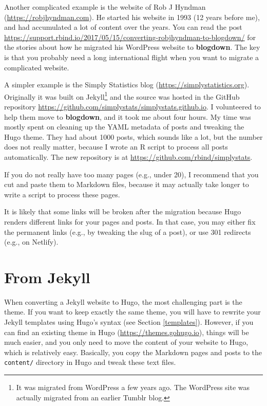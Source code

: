 \documentclass[12pt,]{krantz}
\theoremstyle{definition}
\theoremstyle{definition}
\theoremstyle{definition}
\theoremstyle{remark}
\begin{document}
Another complicated example is the website of Rob J Hyndman
(\url{https://robjhyndman.com}). He started his website in 1993 (12
years before me), and had accumulated a lot of content over the years.
You can read the post
\url{https://support.rbind.io/2017/05/15/converting-robjhyndman-to-blogdown/}
for the stories about how he migrated his WordPress website to
\textbf{blogdown}. The key is that you probably need a long
international flight when you want to migrate a complicated website.

A simpler example is the Simply Statistics blog
(\url{https://simplystatistics.org}). Originally it was built on
Jekyll\footnote{It was migrated from WordPress a few years ago. The
  WordPress site was actually migrated from an earlier Tumblr blog.} and
the source was hosted in the GitHub repository
\url{https://github.com/simplystats/simplystats.github.io}. I
volunteered to help them move to \textbf{blogdown}, and it took me about
four hours. My time was mostly spent on cleaning up the YAML metadata of
posts and tweaking the Hugo theme. They had about 1000 posts, which
sounds like a lot, but the number does not really matter, because I
wrote an R script to process all posts automatically. The new repository
is at \url{https://github.com/rbind/simplystats}.

If you do not really have too many pages (e.g., under 20), I recommend
that you cut and paste them to Markdown files, because it may actually
take longer to write a script to process these pages.

It is likely that some links will be broken after the migration because
Hugo renders different links for your pages and posts. In that case, you
may either fix the permanent links (e.g., by tweaking the slug of a
post), or use 301 redirects (e.g., on Netlify).

\section{From Jekyll}\label{from-jekyll}

When converting a Jekyll website to Hugo, the most
challenging part is the theme. If you want to keep exactly the same
theme, you will have to rewrite your Jekyll templates using Hugo's
syntax (see Section \ref{templates}). However, if you can find an
existing theme in Hugo (\url{https://themes.gohugo.io}), things will be
much easier, and you only need to move the content of your website to
Hugo, which is relatively easy. Basically, you copy the Markdown pages
and posts to the \texttt{content/} directory in Hugo and tweak these
text files.
\end{document}
